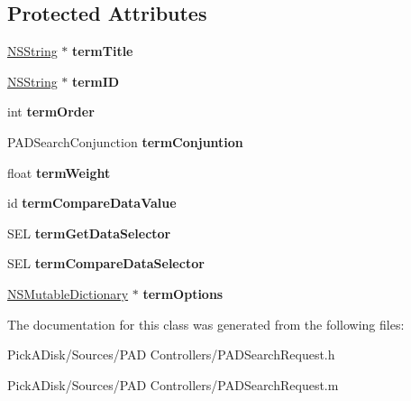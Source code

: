 \subsection*{Protected Attributes}
\begin{DoxyCompactItemize}
\item 
\hypertarget{interface_p_a_d_search_term_a046722435f93b01b6fbf53b3c4aab97a}{
\hyperlink{class_n_s_string}{NSString} $\ast$ {\bfseries termTitle}}
\label{interface_p_a_d_search_term_a046722435f93b01b6fbf53b3c4aab97a}

\item 
\hypertarget{interface_p_a_d_search_term_a2b020428b8ce9b4ffcc2a38f6e2e9ea5}{
\hyperlink{class_n_s_string}{NSString} $\ast$ {\bfseries termID}}
\label{interface_p_a_d_search_term_a2b020428b8ce9b4ffcc2a38f6e2e9ea5}

\item 
\hypertarget{interface_p_a_d_search_term_a2e51e6df23872d57ae1a01da998a1971}{
int {\bfseries termOrder}}
\label{interface_p_a_d_search_term_a2e51e6df23872d57ae1a01da998a1971}

\item 
\hypertarget{interface_p_a_d_search_term_a38dc34c189c3d83bdcd5a87d47318ffa}{
PADSearchConjunction {\bfseries termConjuntion}}
\label{interface_p_a_d_search_term_a38dc34c189c3d83bdcd5a87d47318ffa}

\item 
\hypertarget{interface_p_a_d_search_term_a50eed9cc063fe6396c5198629d88648b}{
float {\bfseries termWeight}}
\label{interface_p_a_d_search_term_a50eed9cc063fe6396c5198629d88648b}

\item 
\hypertarget{interface_p_a_d_search_term_a8870289ea29c0fc041de4c3b298c1043}{
id {\bfseries termCompareDataValue}}
\label{interface_p_a_d_search_term_a8870289ea29c0fc041de4c3b298c1043}

\item 
\hypertarget{interface_p_a_d_search_term_a7d36cccb5ce158cb911ad28cf18fffa2}{
SEL {\bfseries termGetDataSelector}}
\label{interface_p_a_d_search_term_a7d36cccb5ce158cb911ad28cf18fffa2}

\item 
\hypertarget{interface_p_a_d_search_term_a54766404a5d5389b824384260ce8a324}{
SEL {\bfseries termCompareDataSelector}}
\label{interface_p_a_d_search_term_a54766404a5d5389b824384260ce8a324}

\item 
\hypertarget{interface_p_a_d_search_term_ae333657c3e02fd77000b397038f1ed47}{
\hyperlink{class_n_s_mutable_dictionary}{NSMutableDictionary} $\ast$ {\bfseries termOptions}}
\label{interface_p_a_d_search_term_ae333657c3e02fd77000b397038f1ed47}

\end{DoxyCompactItemize}


The documentation for this class was generated from the following files:\begin{DoxyCompactItemize}
\item 
PickADisk/Sources/PAD Controllers/PADSearchRequest.h\item 
PickADisk/Sources/PAD Controllers/PADSearchRequest.m\end{DoxyCompactItemize}
